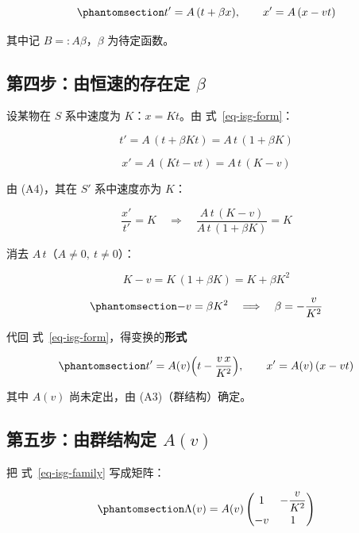 \documentclass[
  chinese,
  a4paper,
  UTF8,
  12pt,
  oneside,
  openany]{ctexbook}
\theoremstyle{plain}
\theoremstyle{plain}
\theoremstyle{plain}
\theoremstyle{definition}
\theoremstyle{plain}
\theoremstyle{plain}
\theoremstyle{remark}
\begin{document}
\begin{equation}\protect\phantomsection\label{eq-isg-form}{
t'=A\,(t+\beta x),\qquad x'=A\,(x-vt)
}\end{equation}

其中记 \(B=:A\beta\)，\(\beta\) 为待定函数。

\subsection{\texorpdfstring{第四步：由恒速的存在定
\(\beta\)}{第四步：由恒速的存在定 \textbackslash beta}}\label{ux7b2cux56dbux6b65ux7531ux6052ux901fux7684ux5b58ux5728ux5b9a-beta}

设某物在 \(S\) 系中速度为 \(K\)：\(x=Kt\)。由 式~\ref{eq-isg-form}：

\[
t'=A\,(t+\beta K t)=A\,t\,(1+\beta K)
\]

\[
x'=A\,(Kt-vt)=A\,t\,(K-v)
\]

由 (A4)，其在 \(S'\) 系中速度亦为 \(K\)：

\[
\frac{x'}{t'}=K
\quad\Longrightarrow\quad
\frac{A\,t\,(K-v)}{A\,t\,(1+\beta K)}=K
\]

消去 \(A\,t\)（\(A\neq0,\ t\neq0\)）：

\[
K-v=K\,(1+\beta K)=K+\beta K^{2}
\]

\begin{equation}\protect\phantomsection\label{eq-isg-beta}{
-v=\beta K^{2}
\quad\Longrightarrow\quad
\beta=-\frac{v}{K^{2}}
}\end{equation}

代回 式~\ref{eq-isg-form}，得变换的\textbf{形式}

\begin{equation}\protect\phantomsection\label{eq-isg-family}{
t'=A(v)\Bigl(t-\frac{v\,x}{K^{2}}\Bigr),\qquad
x'=A(v)\,(x-vt)
}\end{equation}

其中 \(A(v)\) 尚未定出，由 (A3)（群结构）确定。

\subsection{\texorpdfstring{第五步：由群结构定
\(A(v)\)}{第五步：由群结构定 A(v)}}\label{ux7b2cux4e94ux6b65ux7531ux7fa4ux7ed3ux6784ux5b9a-av}

把 式~\ref{eq-isg-family} 写成矩阵：

\begin{equation}\protect\phantomsection\label{eq-isg-Lambda}{
\Lambda(v)=A(v)
\begin{pmatrix}
1 & -\dfrac{v}{K^{2}}\\[6pt]
-v & 1
\end{pmatrix}
}\end{equation}
\end{document}
